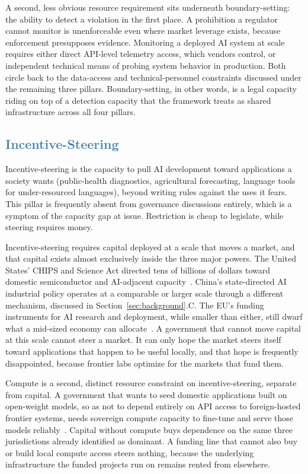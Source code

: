 \documentclass[journal]{IEEEtran}
\begin{document}
A second, less obvious resource requirement sits underneath boundary-setting: the ability to detect a violation in the first place. A prohibition a regulator cannot monitor is unenforceable even where market leverage exists, because enforcement presupposes evidence. Monitoring a deployed AI system at scale requires either direct API-level telemetry access, which vendors control, or independent technical means of probing system behavior in production. Both circle back to the data-access and technical-personnel constraints discussed under the remaining three pillars. Boundary-setting, in other words, is a legal capacity riding on top of a detection capacity that the framework treats as shared infrastructure across all four pillars.

\subsection{\textcolor{steelblue}{Incentive-Steering}}

Incentive-steering is the capacity to pull AI development toward applications a society wants (public-health diagnostics, agricultural forecasting, language tools for under-resourced languages), beyond writing rules against the uses it fears. This pillar is frequently absent from governance discussions entirely, which is a symptom of the capacity gap at issue. Restriction is cheap to legislate, while steering requires money.

Incentive-steering requires capital deployed at a scale that moves a market, and that capital exists almost exclusively inside the three major powers. The United States' CHIPS and Science Act directed tens of billions of dollars toward domestic semiconductor and AI-adjacent capacity~\cite{chipsact2022}.
China's state-directed AI industrial policy operates at a comparable or larger scale through a different mechanism, discussed in Section~\ref{sec:background}.C. The EU's funding instruments for AI research and deployment, while smaller than either, still dwarf what a mid-sized economy can allocate~\cite{eccommission2024aiinnovation}.
A government that cannot move capital at this scale cannot steer a market. It can only hope the market steers itself toward applications that happen to be useful locally, and that hope is frequently disappointed, because frontier labs optimize for the markets that fund them.

Compute is a second, distinct resource constraint on incentive-steering, separate from capital. A government that wants to seed domestic applications built on open-weight models, so as not to depend entirely on API access to foreign-hosted frontier systems, needs sovereign compute capacity to fine-tune and serve those models reliably~\cite{huang2026fivelayers}.
Capital without compute buys dependence on the same three jurisdictions already identified as dominant. A funding line that cannot also buy or build local compute access steers nothing, because the underlying infrastructure the funded projects run on remains rented from elsewhere.
\end{document}
